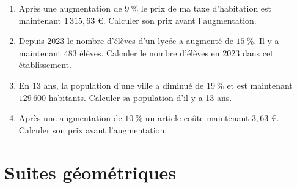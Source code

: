 \documentclass[11pt]{article}
\begin{document}
\begin{exercice}
\begin{enumerate}
	\item Après une augmentation de $9~\%$ le prix de ma taxe d'habitation est maintenant $1\,315{,}63$ €. Calculer son prix avant l'augmentation.
	\item Depuis 2023 le nombre d'élèves d'un lycée a augmenté de $15~\%$. Il y a maintenant $483$ élèves. Calculer le nombre d'élèves en 2023 dans cet établissement.
	\item En 13 ans, la population d'une ville a diminué de $19~\%$ et est maintenant $129\,600$ habitants. Calculer sa population d'il y a 13 ans.
	\item Après une augmentation de $10~\%$ un article coûte maintenant $3{,}63$ €. Calculer son prix avant l'augmentation.
\end{enumerate}
\end{exercice}

\newpage

\section{Suites géométriques }
\end{document}
